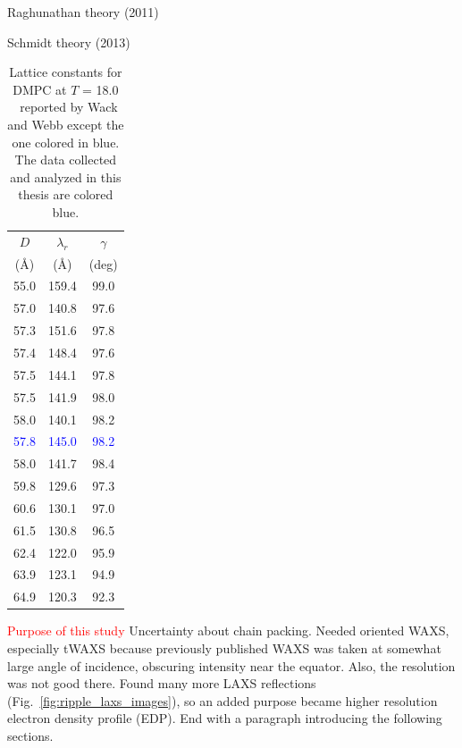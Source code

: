 Raghunathan theory (2011)

Schmidt theory (2013)

\begin{table}[htbp]
\centering
  \begin{tabular}{ccc}
    \hline
    $D$ & $\lambda_r$ & $\gamma$ \\
    (\AA) & (\AA) & (deg) \\
    \hline
    55.0 & 159.4 & 99.0 \\
    57.0 & 140.8 & 97.6 \\
    57.3 & 151.6 & 97.8 \\
    57.4 & 148.4 & 97.6 \\
    57.5	 & 144.1 & 97.8 \\
    57.5 & 141.9 & 98.0 \\
    58.0 & 140.1 & 98.2 \\
    \textcolor{blue}{57.8} & \textcolor{blue}{145.0} & \textcolor{blue}{98.2} \\
    58.0 & 141.7 & 98.4 \\
    59.8 & 129.6 & 97.3 \\
    60.6 & 130.1 & 97.0 \\
    61.5 & 130.8 & 96.5 \\
    62.4 & 122.0 & 95.9 \\
    63.9 & 123.1 & 94.9 \\
    64.9 & 120.3 & 92.3 \\    
    \hline 
  \end{tabular}
  \caption{Lattice constants for DMPC at $T$ = 18.0 \textcelsius\
  reported by Wack and Webb \cite{ref:Wack89} except the one colored in blue. 
  The data collected and analyzed in this thesis
  are colored blue.} 
\end{table}

\textcolor{red}{Purpose of this study}
Uncertainty about chain packing. Needed oriented WAXS, especially tWAXS because
previously published WAXS was taken at somewhat large angle of incidence, 
obscuring intensity near the equator. Also, the resolution was not good there.
Found many more LAXS reflections (Fig.~\ref{fig:ripple_laxs_images}), so an added purpose
became higher resolution electron density profile (EDP). End with a 
paragraph introducing the following sections.

